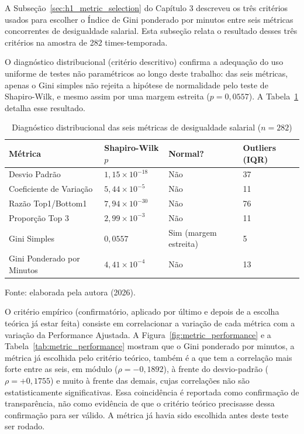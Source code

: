 A Subseção~\ref{sec:h1_metric_selection} do Capítulo 3 descreveu os três critérios usados para escolher o Índice de Gini ponderado por minutos entre seis métricas concorrentes de desigualdade salarial. Esta subseção relata o resultado desses três critérios na amostra de 282 times-temporada.

O diagnóstico distribucional (critério descritivo) confirma a adequação do uso uniforme de testes não paramétricos ao longo deste trabalho: das seis métricas, apenas o Gini simples não rejeita a hipótese de normalidade pelo teste de Shapiro-Wilk, e mesmo assim por uma margem estreita ($p = 0{,}0557$). A Tabela~\ref{tab:metric_diagnostics} detalha esse resultado.

\begin{table}[htb]
    \centering
    \caption{Diagnóstico distribucional das seis métricas de desigualdade salarial ($n=282$)}
    \label{tab:metric_diagnostics}
    \begin{tabular}{|p{4.4cm}|p{2.4cm}|p{1.8cm}|p{2.0cm}|}
    \hline
    \textbf{Métrica} & \textbf{Shapiro-Wilk $p$} & \textbf{Normal?} & \textbf{Outliers (IQR)} \\
    \hline
    Desvio Padrão & $1{,}15 \times 10^{-18}$ & Não & 37 \\
    \hline
    Coeficiente de Variação & $5{,}44 \times 10^{-5}$ & Não & 11 \\
    \hline
    Razão Top1/Bottom1 & $7{,}94 \times 10^{-30}$ & Não & 76 \\
    \hline
    Proporção Top 3 & $2{,}99 \times 10^{-3}$ & Não & 11 \\
    \hline
    Gini Simples & $0{,}0557$ & Sim (margem estreita) & 5 \\
    \hline
    Gini Ponderado por Minutos & $4{,}41 \times 10^{-4}$ & Não & 13 \\
    \hline
    \end{tabular}
    \begin{flushleft}
    \footnotesize Fonte: elaborada pela autora (2026).
    \end{flushleft}
\end{table}

O critério empírico (confirmatório, aplicado por último e depois de a escolha teórica já estar feita) consiste em correlacionar a variação de cada métrica com a variação da Performance Ajustada. A Figura~\ref{fig:metric_performance} e a Tabela~\ref{tab:metric_performance} mostram que o Gini ponderado por minutos, a métrica já escolhida pelo critério teórico, também é a que tem a correlação mais forte entre as seis, em módulo ($\rho = -0{,}1892$), à frente do desvio-padrão ($\rho = +0{,}1755$) e muito à frente das demais, cujas correlações não são estatisticamente significativas. Essa coincidência é reportada como confirmação de transparência, não como evidência de que o critério teórico precisasse dessa confirmação para ser válido. A métrica já havia sido escolhida antes deste teste ser rodado.

